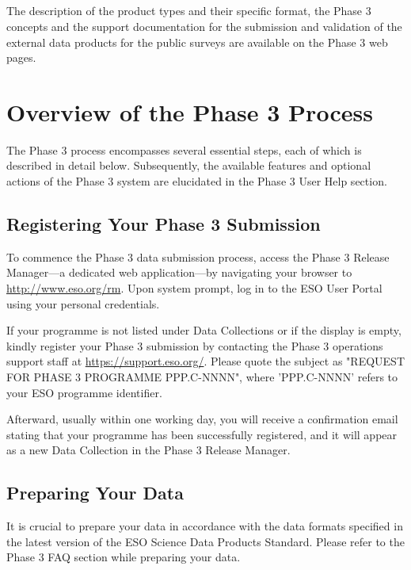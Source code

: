 \documentclass[a4paper,10pt]{book}
\begin{document}
\section{}
The description of the product types and their specific format, the Phase 3 concepts and the support documentation for the submission and validation of the external data products for the public surveys are available on the Phase 3 web pages.



\chapter{Overview of the Phase 3 Process}

The Phase 3 process encompasses several essential steps, each of which is described in detail below. Subsequently, the available features and optional actions of the Phase 3 system are elucidated in the Phase 3 User Help section.

\section{Registering Your Phase 3 Submission}

To commence the Phase 3 data submission process, access the Phase 3 Release Manager—a dedicated web application—by navigating your browser to \url{http://www.eso.org/rm}. Upon system prompt, log in to the ESO User Portal using your personal credentials.

If your programme is not listed under Data Collections or if the display is empty, kindly register your Phase 3 submission by contacting the Phase 3 operations support staff at \url{https://support.eso.org/}. Please quote the subject as "REQUEST FOR PHASE 3 PROGRAMME PPP.C-NNNN", where 'PPP.C-NNNN' refers to your ESO programme identifier.

Afterward, usually within one working day, you will receive a confirmation email stating that your programme has been successfully registered, and it will appear as a new Data Collection in the Phase 3 Release Manager.

\section{Preparing Your Data}

It is crucial to prepare your data in accordance with the data formats specified in the latest version of the ESO Science Data Products Standard. Please refer to the Phase 3 FAQ section while preparing your data.
\end{document}
